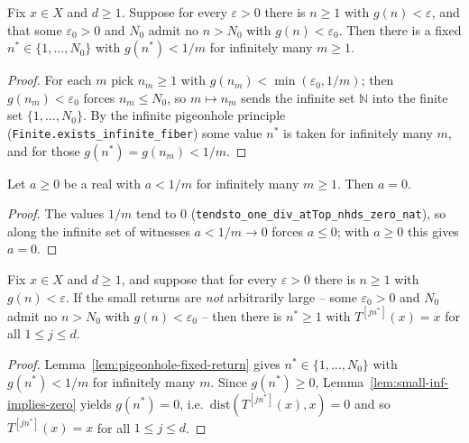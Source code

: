 \begin{lemma}
    \label{lem:pigeonhole-fixed-return}
    \leanok
    Fix $x \in X$ and $d \ge 1$. Suppose for every $\varepsilon > 0$ there is
    $n \ge 1$ with $g(n) < \varepsilon$, and that some $\varepsilon_0 > 0$ and
    $N_0$ admit no $n > N_0$ with $g(n) < \varepsilon_0$. Then there is a fixed
    $n^\ast \in \{1, \dots, N_0\}$ with $g(n^\ast) < 1/m$ for infinitely many
    $m \ge 1$.
\end{lemma}
\begin{proof}
    For each $m$ pick $n_m \ge 1$ with $g(n_m) < \min(\varepsilon_0, 1/m)$; then
    $g(n_m) < \varepsilon_0$ forces $n_m \le N_0$, so $m \mapsto n_m$ sends the
    infinite set $\mathbb{N}$ into the finite set $\{1, \dots, N_0\}$. By the
    infinite pigeonhole principle (\texttt{Finite.exists\_infinite\_fiber}) some
    value $n^\ast$ is taken for infinitely many $m$, and for those
    $g(n^\ast) = g(n_m) < 1/m$.
\end{proof}

\begin{lemma}
    \label{lem:small-inf-implies-zero}
    \leanok
    Let $a \ge 0$ be a real with $a < 1/m$ for infinitely many $m \ge 1$. Then
    $a = 0$.
\end{lemma}
\begin{proof}
    The values $1/m$ tend to $0$
    (\texttt{tendsto\_one\_div\_atTop\_nhds\_zero\_nat}), so along the infinite
    set of witnesses $a < 1/m \to 0$ forces $a \le 0$; with $a \ge 0$ this gives
    $a = 0$.
\end{proof}

\begin{lemma}
    \label{lem:recurrence-periodic}
    \leanok
    Fix $x \in X$ and $d \ge 1$, and suppose that for every $\varepsilon > 0$
    there is $n \ge 1$ with $g(n) < \varepsilon$. If the small returns are
    \emph{not} arbitrarily large -- some $\varepsilon_0 > 0$ and $N_0$ admit no
    $n > N_0$ with $g(n) < \varepsilon_0$ -- then there is $n^\ast \ge 1$ with
    $T^{[j n^\ast]}(x) = x$ for all $1 \le j \le d$.
\end{lemma}
\begin{proof}
    Lemma~\ref{lem:pigeonhole-fixed-return} gives $n^\ast \in \{1, \dots, N_0\}$
    with $g(n^\ast) < 1/m$ for infinitely many $m$. Since $g(n^\ast) \ge 0$,
    Lemma~\ref{lem:small-inf-implies-zero} yields $g(n^\ast) = 0$, i.e.\
    $\mathrm{dist}(T^{[j n^\ast]}(x), x) = 0$ and so $T^{[j n^\ast]}(x) = x$ for
    all $1 \le j \le d$.
\end{proof}

